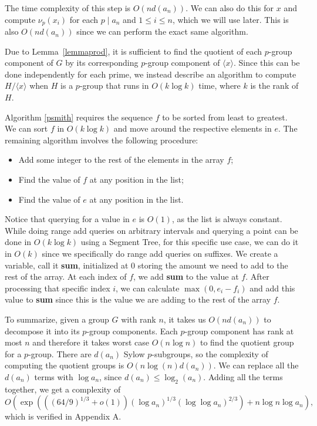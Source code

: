 \documentclass[11pt]{amsart}
\theoremstyle{definition}
\newcommand{\setx}{\langle x \rangle}
\renewcommand{\leq}{\leqslant}
\numberwithin{equation}{section}
\begin{document}
The time complexity of this step is $O(n d(a_n))$. We can also do this for $x$ and compute $\nu_p(x_i)$ for each $p\mid a_n$ and $1\leq i \leq n$, which we will use later. This is also $O(n d(a_n))$ since we can perform the exact same algorithm.

Due to Lemma~\ref{lemmaprod}, it is sufficient to find the quotient of each $p$-group component of $G$ by its corresponding $p$-group component of $\setx$. Since this can be done independently for each prime, we instead describe an algorithm to compute $H/\setx$ when $H$ is a $p$-group that runs in $O(k \log k)$ time, where $k$ is the rank of $H$. 

Algorithm \ref{psmith} requires the sequence $f$ to be sorted from least to greatest. We can sort $f$ in $O(k\log k)$ and move around the respective elements in $e$. The remaining algorithm involves the following procedure:
\begin{itemize}
    \item Add some integer to the rest of the elements in the array $f$;
    \item Find the value of $f$ at any position in the list; 
    \item Find the value of $e$ at any position in the list.
\end{itemize}
Notice that querying for a value in $e$ is $O(1)$, as the list is always constant. While doing range add queries on arbitrary intervals and querying a point can be done in $O(k \log k)$ using a Segment Tree, for this specific use case, we can do it in $O(k)$ since we specifically do range add queries on suffixes. We create a variable, call it \textbf{sum}, initialized at 0 storing the amount we need to add to the rest of the array. At each index of $f$, we add \textbf{sum} to the value at $f$. After processing that specific index $i$, we can calculate $\max(0,e_i-f_i)$ and add this value to \textbf{sum} since this is the value we are adding to the rest of the array $f$.

To summarize, given a group $G$ with rank $n$, it takes us $O(nd(a_n))$ to decompose it into its $p$-group components. Each $p$-group component has rank at most $n$ and therefore it takes worst case $O(n\log n)$ to find the quotient group for a $p$-group. There are $d(a_n)$ Sylow $p$-subgroups, so the complexity of computing the quotient groups is $O(n\log(n) d(a_n))$. We can replace all the $d(a_n)$ terms with $\log a_n$, since $d(a_n) \leq \log_2(a_n)$. Adding all the terms together, we get a complexity of 
\[
O(\exp(((64/9)^{1/3} + o(1)) (\log a_n)^{1/3} (\log \log a_n)^{2/3}) + n \log n \log a_n),
\]
which is verified in Appendix A. 
\end{document}
